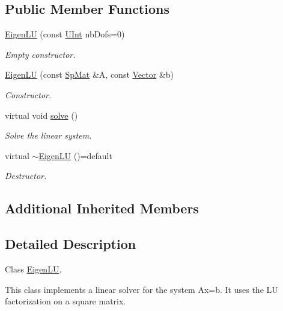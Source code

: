 \subsection*{Public Member Functions}
\begin{DoxyCompactItemize}
\item 
\hyperlink{classFVCode3D_1_1EigenLU_a23b6c03c21e82399a13c2c0e3370e0a1}{Eigen\+LU} (const \hyperlink{namespaceFVCode3D_a4bf7e328c75d0fd504050d040ebe9eda}{U\+Int} nb\+Dofs=0)
\begin{DoxyCompactList}\small\item\em Empty constructor. \end{DoxyCompactList}\item 
\hyperlink{classFVCode3D_1_1EigenLU_af14fce48a3c29af1b0111ab333a99722}{Eigen\+LU} (const \hyperlink{namespaceFVCode3D_ac1032289d96638cf0ad6c52ef639095f}{Sp\+Mat} \&A, const \hyperlink{namespaceFVCode3D_a16ccf345652402bccd1a5d2e6782526c}{Vector} \&b)
\begin{DoxyCompactList}\small\item\em Constructor. \end{DoxyCompactList}\item 
virtual void \hyperlink{classFVCode3D_1_1EigenLU_a8ba5cd2307cbf7309fe77cd0b60edb60}{solve} ()
\begin{DoxyCompactList}\small\item\em Solve the linear system. \end{DoxyCompactList}\item 
virtual \hyperlink{classFVCode3D_1_1EigenLU_a3412efd8ad60ab2f5e6c41dd99fc94f9}{$\sim$\+Eigen\+LU} ()=default
\begin{DoxyCompactList}\small\item\em Destructor. \end{DoxyCompactList}\end{DoxyCompactItemize}
\subsection*{Additional Inherited Members}


\subsection{Detailed Description}
Class \hyperlink{classFVCode3D_1_1EigenLU}{Eigen\+LU}. 

This class implements a linear solver for the system Ax=b. It uses the LU factorization on a square matrix. 


